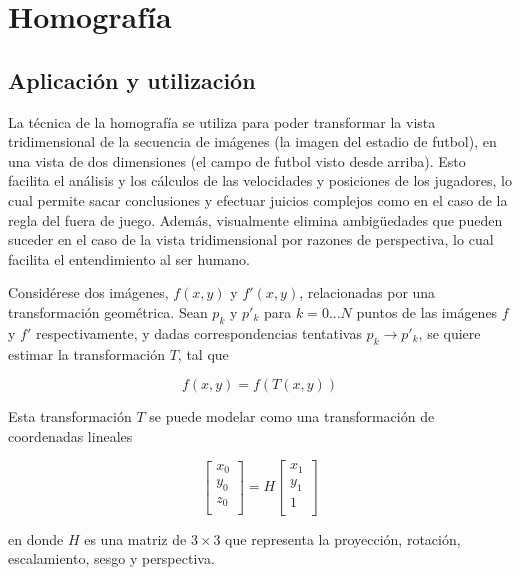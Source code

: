 \documentclass[a4paper,10pt]{article}
\begin{document}
\section{Homografía}
\label{sec:homography}

\subsection{Aplicación y utilización}

La técnica de la homografía se utiliza para poder transformar la vista
tridimensional de la secuencia de imágenes (la imagen del estadio de futbol), en
una vista de dos dimensiones (el campo de futbol visto desde arriba). Esto
facilita el análisis y los cálculos de las velocidades y posiciones de los
jugadores, lo cual permite sacar conclusiones y efectuar juicios complejos como
en el caso de la regla del fuera de juego. Además, visualmente elimina
ambigüedades que pueden suceder en el caso de la vista tridimensional por
razones de perspectiva, lo cual facilita el entendimiento al ser humano.

Considérese dos imágenes, $f(x,y)$ y $f'(x,y)$, relacionadas por una transformación geométrica. Sean $p_{k}$ y $p'_{k}$ para $k = 0 ... N$ puntos de las imágenes
$f$ y $f'$ respectivamente, y dadas correspondencias tentativas $p_{k} \to p'_{k}$, se quiere estimar la transformación $T$, tal que

\begin{equation}
    f(x,y) = f(T(x,y))
\end{equation}

Esta transformación $T$ se puede modelar como una transformación de coordenadas lineales

\begin{equation}
    \begin{bmatrix}
        x_{0} \\
        y_{0} \\
        z_{0} \\
    \end{bmatrix}
    = H
    \begin{bmatrix}
        x_{1} \\
        y_{1} \\
        1 \\
    \end{bmatrix}
\end{equation}

en donde $H$ es una matriz de $3 \times 3$ que representa la proyección, rotación, escalamiento, sesgo y perspectiva.
\end{document}
